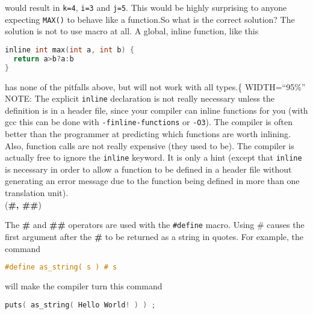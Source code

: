 would result in \texttt{k=4}, \texttt{i=3} and \texttt{j=5}. This would be
highly surprising to anyone expecting \texttt{MAX()} to behave like a
function.So what is the correct solution? The solution is not to use macro at
all. A global, inline function, like this
\lstset{basicstyle=\scriptsize, numbers=left, captionpos=b, tabsize=4}
\begin{lstlisting}[caption=Section \thesection listing \arabic{preprocnt},language={C},
breaklines=true,xleftmargin=15pt, label=lst:section\thesection listing\arabic{preprocnt}]
inline int max(int a, int b) { 
  return a>b?a:b 
}
\end{lstlisting}

has none of the pitfalls above, but will not work with all types.\{\textbar{}
WIDTH=``95\%'' 
NOTE: The explicit \texttt{inline} declaration is not really
necessary unless the definition is in a header file, since your compiler can
inline functions for you (with gcc this can be done with
\texttt{-finline-functions} or \texttt{-O3}). The compiler is often better than
the programmer at predicting which functions are worth inlining. Also, function
calls are not really expensive (they used to be). The compiler is actually free
to ignore the \texttt{inline} keyword. It is only a hint (except that
\texttt{inline} is necessary in order to allow a function to be defined in a
header file without generating an error message due to the function being
defined in more than one translation unit). \\

(\textbf{\#, \#\#})

The \textbf{\#} and \textbf{\#\#} operators are used with the \texttt{\#define}
macro. Using \# causes the first argument after the \textbf{\#} to be returned
as a string in quotes. For example, the command 
\lstset{basicstyle=\scriptsize, numbers=left, captionpos=b, tabsize=4}
\begin{lstlisting}[caption=Section \thesection listing \arabic{preprocnt},language={C},
breaklines=true,xleftmargin=15pt, label=lst:section\thesection listing\arabic{preprocnt}]
#define as_string( s ) # s
\end{lstlisting}
		
will make the compiler turn this command 
\lstset{basicstyle=\scriptsize, numbers=left, captionpos=b, tabsize=4}
\begin{lstlisting}[caption=Section \thesection listing \arabic{preprocnt},language={C},
breaklines=true,xleftmargin=15pt, label=lst:section\thesection listing\arabic{preprocnt}]
puts( as_string( Hello World! ) ) ;
\end{lstlisting}
		
